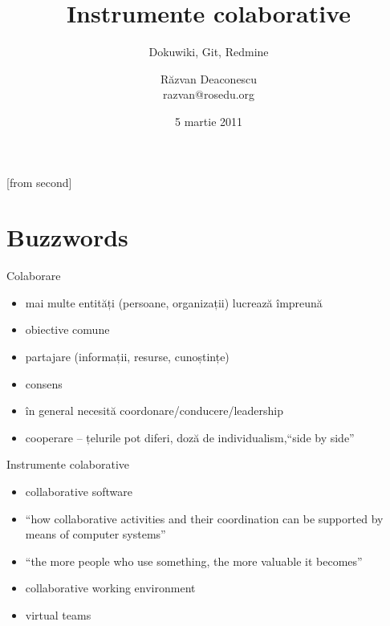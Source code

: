 \documentclass{beamer}
\title[Intrumente colaborative]{Instrumente colaborative}
\subtitle{Dokuwiki, Git, Redmine}
\institute{ROSEdu Tech Talks}
\author[Răzvan Deaconescu]{Răzvan Deaconescu\\
  razvan@rosedu.org}
\date{5 martie 2011}
\begin{document}
[from second]



\frame{\titlepage}

\frame{\tableofcontents}

\section{Buzzwords}

\begin{frame}{Colaborare}
  \begin{itemize}
    \item mai multe entități (persoane, organizații) lucrează împreună
    \item obiective comune
    \item partajare (informații, resurse, cunoștințe)
    \item consens
    \item în general necesită coordonare/conducere/leadership
    \item cooperare -- țelurile pot diferi, doză de individualism,``side by
    side''
  \end{itemize}
\end{frame}

\begin{frame}{Instrumente colaborative}
  \begin{itemize}
    \item collaborative software
    \item ``how collaborative activities and their coordination can be
    supported by means of computer systems''
    \item ``the more people who use something, the more valuable it becomes''
    \item collaborative working environment
    \item virtual teams
  \end{itemize}
\end{frame}
\end{document}
